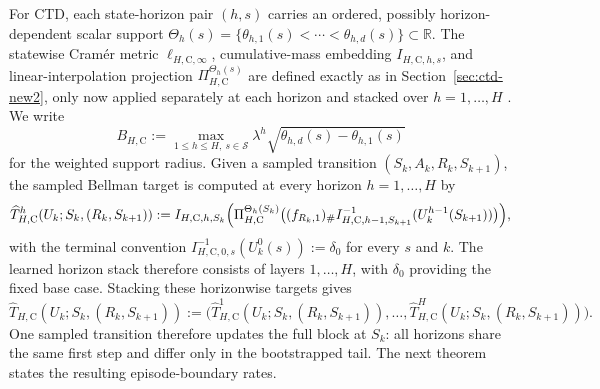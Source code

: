\documentclass{article}
\newcommand{\X}{\mathcal{S}}
\begin{document}
For CTD, each state-horizon pair $(h,s)$ carries an ordered, possibly horizon-dependent scalar support $\Theta_h(s)=\{\theta_{h,1}(s)<\cdots<\theta_{h,d}(s)\}\subset\mathbb R$. The statewise Cram\'er metric $\ell_{H, \mathrm C, \infty}$, cumulative-mass embedding $I_{H, \mathrm C, h, s}$, and linear-interpolation projection $\Pi^{\Theta_h(s)}_{H, \mathrm C}$ are defined exactly as in Section~\ref{sec:ctd-new2}, only now applied separately at each horizon and stacked over $h=1,\dots,H$ \citep{rowland2018analysis,bellemare2023distributional}. We write
\begin{equation}
B_{H,\mathrm C}:=\max_{1\le h\le H,\ s\in\X}\lambda^h\sqrt{\theta_{h,d}(s)-\theta_{h,1}(s)}
\end{equation}
for the weighted support radius. Given a sampled transition $(S_k,A_k,R_k,S_{k+1})$, the sampled Bellman target is computed at every horizon $h=1,\dots,H$ by
\begin{equation}
\widehat T_{H,\mathrm C}^h(U_k;S_k,(R_k,S_{k+1})) := I_{H,\mathrm C,h,S_k} \Bigl(\Pi_{H,\mathrm C}^{\Theta_h(S_k)}\bigl((f_{R_k,1})_\# I_{H,\mathrm C,h-1,S_{k+1}}^{-1}(U_k^{h-1}(S_{k+1}))\bigr)\Bigr),
\end{equation}
with the terminal convention $I_{H,\mathrm C,0,s}^{-1}(U_k^0(s)):=\delta_0$ for every $s$ and $k$. The learned horizon stack therefore consists of layers $1,\dots,H$, with $\delta_0$ providing the fixed base case. Stacking these horizonwise targets gives
\begin{equation}
\widehat T_{H,\mathrm C}(U_k;S_k,(R_k,S_{k+1})) := \bigl(\widehat T_{H,\mathrm C}^1(U_k;S_k,(R_k,S_{k+1})), \dots, \widehat T_{H,\mathrm C}^H(U_k;S_k,(R_k,S_{k+1}))\bigr).
\end{equation}
One sampled transition therefore updates the full block at $S_k$: all horizons share the same first step and differ only in the bootstrapped tail. The next theorem states the resulting episode-boundary rates.
\end{document}
